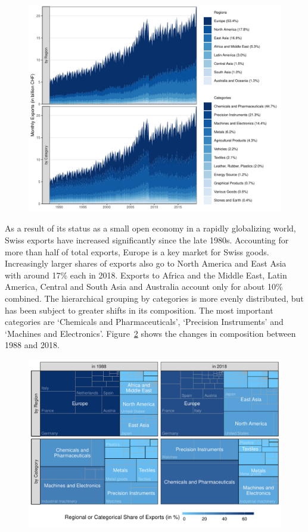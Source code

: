 \documentclass[a4paper,fleqn,11pt]{article}
\begin{document}
\begin{figure}[H]
	\includegraphics[width=\textwidth]{fig/fig_area}
	\label{fig:area}
\end{figure}

As a result of its status as a small open economy in a rapidly globalizing world, Swiss exports have increased significantly since the late 1980s. Accounting for more than half of total exports, Europe is a key market for Swiss goods. Increasingly larger shares of exports also go to North America and East Asia with around 17\% each in 2018. Exports to Africa and the Middle East, Latin America, Central and South Asia and Australia account only for about 10\% combined. The hierarchical grouping by categories is more evenly distributed, but has been subject to greater shifts in its composition. The most important categories are `Chemicals and Pharmaceuticals', `Precision Instruments' and `Machines and Electronics'. Figure~\ref{fig:treemap} shows the changes in composition between 1988 and 2018.

\begin{figure}[H]
	\includegraphics[width=\textwidth]{fig/fig_treemap}
	\label{fig:treemap}
\end{figure}
\end{document}
